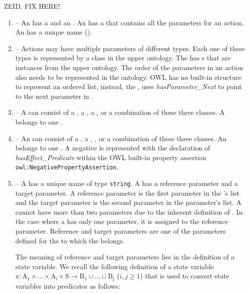 ZEID, FIX HERE!

\begin{enumerate}
\item {} -- An  has a  and an . An  has a  that contains all the parameters for an action. An  has a unique name ().
\item {} -- Actions may have multiple parameters of different types. Each one of these types is represented by a class in the upper ontology. The  has s that are instances from the upper ontology. The order of the parameters in an  action also needs to be represented in the ontology. OWL has no built-in structure to represent an ordered list, instead, the , uses \emph{hasParameter\_Next} to point to the next parameter in .
\item {} -- A  can consist of a , a , a , or a combination of these three classes. A  belongs to one .
\item {} -- An  can consist of a , a , , or a combination of these three classes. An  belongs to one . A negative  is represented with the declaration of \emph{hasEffect\_Predicate} within the OWL built-in property assertion \texttt{owl:NegativePropertyAssertion}.
\item {} -- A  has a unique name  of type \texttt{string}. A  has a reference parameter and a target parameter. A reference parameter is the first parameter in the 's list and the target parameter is the second parameter in the parameter's list. A  cannot have more than two parameters due to the inherent definition of . In the case where a  has only one parameter, it is assigned to the reference parameter. Reference and target parameters are one of the parameters defined for the  to which the  belongs.
    
    The meaning of reference and target parameters lies in the definition of a state variable. We recall the following definition of a state variable $\mathrm{x: A_1\times \dots\times A_i\times S\rightarrow B_1\cup\dots\cup B_j}$ ($i, j\geq 1$) that is used to convert state variables into predicates as follows:


\end{enumerate}
